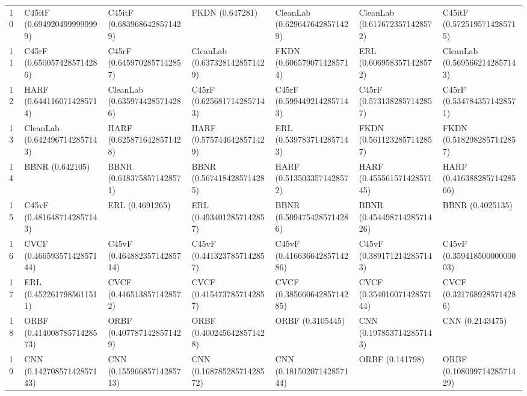 \begin{tabular}{lllllll}
10   &    C45itF (0.6949204999999999) &    C45itF (0.6839686428571429) &                FKDN (0.647281) &  CleanLab (0.6296476428571429) &  CleanLab (0.6176723571428572) &    C45itF (0.5725195714285715) \\
11   &     C45rF (0.6500574285714286) &     C45rF (0.6459702857142857) &  CleanLab (0.6373281428571429) &      FKDN (0.6065790714285714) &       ERL (0.6069583571428572) &  CleanLab (0.5695662142857143) \\
12   &      HARF (0.6441160714285714) &  CleanLab (0.6359744285714286) &     C45rF (0.6256817142857143) &     C45rF (0.5994492142857143) &     C45rF (0.5731382857142857) &     C45rF (0.5347843571428571) \\
13   &  CleanLab (0.6424967142857143) &      HARF (0.6258716428571428) &      HARF (0.5757446428571429) &       ERL (0.5397837142857143) &      FKDN (0.5611232857142857) &      FKDN (0.5182982857142857) \\
14   &                BBNR (0.642105) &      BBNR (0.6183758571428571) &      BBNR (0.5674184285714285) &      HARF (0.5135033571428572) &     HARF (0.45556157142857145) &     HARF (0.41638828571428566) \\
15   &     C45vF (0.4816487142857143) &                ERL (0.4691265) &       ERL (0.4934012857142857) &      BBNR (0.5094754285714286) &     BBNR (0.45449871428571426) &               BBNR (0.4025135) \\
16   &     CVCF (0.46659357142857144) &    C45vF (0.46488235714285714) &     C45vF (0.4413237857142857) &    C45vF (0.41663664285714286) &     C45vF (0.3891712142857143) &    C45vF (0.35941850000000003) \\
17   &       ERL (0.4522617985611511) &      CVCF (0.4465138571428572) &      CVCF (0.4154737857142857) &     CVCF (0.38566064285714285) &     CVCF (0.35401607142857144) &      CVCF (0.3217689285714286) \\
18   &     ORBF (0.41400878571428573) &      ORBF (0.4077871428571429) &      ORBF (0.4002456428571428) &               ORBF (0.3105445) &       CNN (0.1978537142857143) &                CNN (0.2143475) \\
19   &      CNN (0.14270857142857143) &      CNN (0.15596685714285713) &      CNN (0.16878528571428572) &      CNN (0.18150207142857144) &                ORBF (0.141798) &     ORBF (0.10809971428571429) \\
\bottomrule
\end{tabular}

